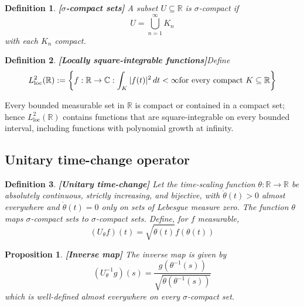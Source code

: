 \documentclass{article}
\newcommand{\assign}{:=}
\newcommand{\tmop}[1]{\ensuremath{\operatorname{#1}}}
\newcommand{\tmstrong}[1]{\textbf{#1}}
\newtheorem{definition}{Definition}
\newtheorem{proposition}{Proposition}
{\theorembodyfont{\rmfamily}\newtheorem{remark}{Remark}}
\begin{document}
\begin{definition}
  {\tmstrong{[$\sigma$-compact sets]\label{def:sigma_compact}}} A subset $U
  \subseteq \mathbb{R}$ is $\sigma$-compact if
  \begin{equation}
    U = \bigcup_{n = 1}^{\infty} K_n
  \end{equation}
  with each $K_n$ compact.
\end{definition}

\begin{definition}
  {\tmstrong{[Locally square-integrable functions]}}\label{def:L2loc} Define
  \begin{equation}
    L^2_{\tmop{loc}} (\mathbb{R}) \assign \left\{ f : \mathbb{R} \to
    \mathbb{C}: \int_K |f (t) |^2  \hspace{0.17em} dt < \infty \text{for every
    compact } K \subseteq \mathbb{R} \right\}
  \end{equation}
\end{definition}

\begin{remark}
  Every bounded measurable set in $\mathbb{R}$ is compact or contained in a
  compact set; hence $L^2_{\tmop{loc}} (\mathbb{R})$ contains functions that
  are square-integrable on every bounded interval, including functions with
  polynomial growth at infinity.
\end{remark}

\subsection{Unitary time-change operator}

\begin{definition}
  {\tmstrong{[Unitary time-change]\label{def:Utheta}}} Let the time-scaling
  function $\theta : \mathbb{R} \to \mathbb{R}$ be absolutely continuous,
  strictly increasing, and bijective, with $\dot{\theta} (t) > 0$ almost
  everywhere and $\dot{\theta} (t) = 0$ only on sets of Lebesgue measure zero.
  The function $\theta$ maps $\sigma$-compact sets to $\sigma$-compact sets.
  Define, for $f$ measurable,
  \begin{equation}
    (U_{\theta} f) (t) = \sqrt{\dot{\theta} (t)} f (\theta (t))
  \end{equation}
\end{definition}

\begin{proposition}
  {\tmstrong{[Inverse map]\label{prop:inverse} }}The inverse map is given by
  \begin{equation}
    (U_{\theta}^{- 1} g) (s) = \frac{g (\theta^{- 1} (s))}{\sqrt{\dot{\theta}
    (\theta^{- 1} (s))}}
  \end{equation}
  which is well-defined almost everywhere on every $\sigma$-compact set.
\end{proposition}
\end{document}
